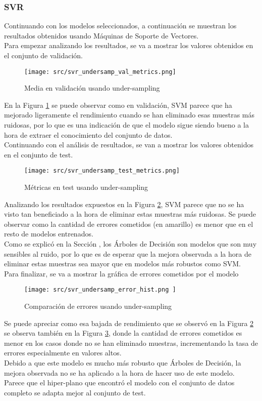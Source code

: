 \subsubsection*{SVR}
Continuando con los modelos seleccionados, a continuación se muestran los resultados obtenidos usando Máquinas de Soporte de Vectores.\\
\linebreak
Para empezar analizando los resultados, se va a mostrar los valores obtenidos en el conjunto de validación.
\begin{figure}[H]
	\centering
	\texttt{[image: src/svr\_undersamp\_val\_metrics.png]}
	\caption{Media en validación usando under-sampling}
	\label{fig:cmp_val_svr}
\end{figure}
En la Figura \ref{fig:cmp_val_svr} se puede observar como en validación, SVM parece que ha mejorado ligeramente el rendimiento cuando se han eliminado esas muestras más ruidosas, por lo que es una indicación de que el modelo sigue siendo bueno a la hora de extraer el conocimiento del conjunto de datos.\\
\clearpage
Continuando con el análisis de resultados, se van a mostrar los valores obtenidos en el conjunto de test.
\begin{figure}[H]
	\centering
	\texttt{[image: src/svr\_undersamp\_test\_metrics.png]}
	\caption{Métricas en test usando under-sampling}
	\label{fig:cmp_test_svr}
\end{figure}
Analizando los resultados expuestos en la Figura \ref{fig:cmp_test_svr}, SVM parece que no se ha visto tan beneficiado a la hora de eliminar estas muestras más ruidosas. Se puede observar como la cantidad de errores cometidos (en amarillo) es menor que en el resto de modelos entrenados.\\
Como se explicó en la Sección , los Árboles de Decisión son modelos que son muy sensibles al ruido, por lo que es de esperar que la mejora observada a la hora de eliminar estas muestras sea mayor que en modelos más robustos como SVM.\\
\clearpage
Para finalizar, se va a mostrar la gráfica de errores cometidos por el modelo
\begin{figure}[H]
	\centering
	\texttt{[image: src/svr\_undersamp\_error\_hist.png ]}
	\caption{Comparación de errores usando under-sampling}
	\label{fig:cmp_error_svr}
\end{figure}
Se puede apreciar como esa bajada de rendimiento que se observó en la Figura \ref{fig:cmp_test_svr} se observa también en la Figura \ref{fig:cmp_error_svr}, donde la cantidad de errores cometidos es menor en los casos donde no se han eliminado muestras, incrementando la tasa de errores especialmente en valores altos.\\
\linebreak
Debido a que este modelo es mucho más robusto que Árboles de Decisión, la mejora observada no se ha aplicado a la hora de hacer uso de este modelo.\\
Parece que el hiper-plano que encontró el modelo con el conjunto de datos completo se adapta mejor al conjunto de test.
\clearpage
